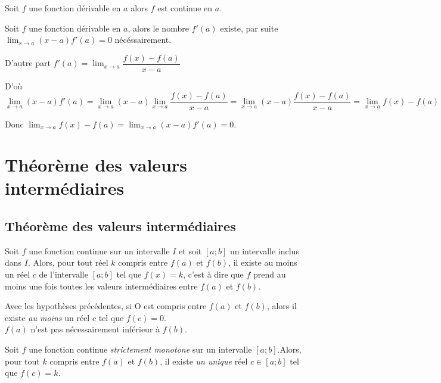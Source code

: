 \documentclass[french]{book}
\newcommand{\ds}{\displaystyle}
\newcommand{\limite}[2][x]{\ds\lim_{#1\rightarrow #2}}
\begin{document}
\begin{prop}
Soit $f$ une fonction dérivable en $a$ alors $f$ est continue en $a$.
\end{prop}

\begin{demo}
Soit $f$ une fonction dérivable en $a$, alors le nombre $f'(a)$ existe, par suite $\limite{a} (x-a)f'(a)= 0$  nécéssairement.

D'autre part $f'(a)= \limite{a} \dfrac{f(x)-f(a)}{x-a}$

D'où
 $$\limite{a} (x-a)f'(a) = \limite{a} (x-a)  \limite{a} \dfrac{f(x)-f(a)}{x-a} =  \limite{a} (x-a) \dfrac{f(x)-f(a)}{x-a} = \limite{a} f(x)-f(a)$$
 
Donc $\limite{a} f(x)-f(a)=\limite{a} (x-a)f'(a)  =0$.
 


\end{demo}

\section{Théorème des valeurs intermédiaires}

\subsection{Théorème des valeurs intermédiaires}

\begin{thm}
 Soit $f$ une fonction continue sur un intervalle $I$ et soit $[a;b]$ un intervalle inclus dans $I$. Alors, pour tout réel $k$ compris entre $f(a)$ et $f(b)$, il existe au moins un réel $c$ de l'intervalle $[a;b]$ tel que $f(x)=k$, c'est  à dire que $f$ prend au moins une fois toutes les valeurs intermédiaires entre $f(a)$ et $f(b)$.
\end{thm}



\begin{rem}
 Avec les hypothèses précédentes, si O est compris entre $f(a)$ et $f(b)$, alors il existe \emph{au moins} un réel $c$ tel que $f(c)=0$. \\

 $f(a)$ n'est pas nécessairement inférieur à $f(b)$.
\end{rem}


\begin{prop}
 Soit $f$ une fonction continue \emph{strictement monotone} sur un intervalle $[a;b]$.Alors, pour tout $k$ compris entre $f(a)$ et $f(b)$, il existe \emph{un unique} réel $c\in[a;b]$ tel que $f(c)=k$.
\end{prop}
\end{document}

